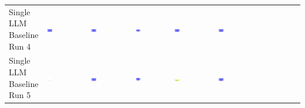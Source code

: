 \begin{table}
\begin{tabular}{@{}mmmmmm@{}}
    \makecell{Single LLM \\ Baseline \\ Run 4} & \includegraphics[width=0.13\textwidth]{./run_4/png/gpt-4o_results/BasicLayout.png} & \includegraphics[width=0.13\textwidth]{./run_4/png/o1-preview_results/BasicLayout.png} & \includegraphics[width=0.13\textwidth]{./run_4/png/claude-3-5-sonnet-20240620_results/BasicLayout.png} & \includegraphics[width=0.13\textwidth]{./run_4/png/watsonx_meta-llama_llama-3-1-70b-instruct_results/BasicLayout.png} & \includegraphics[width=0.13\textwidth]{./run_4/png/watsonx_meta-llama_llama-3-405b-instruct_results/BasicLayout.png} \\
    \makecell{Single LLM \\ Baseline \\ Run 5} & \includegraphics[width=0.13\textwidth]{./run_5/png/gpt-4o_results/BasicLayout.png} & \includegraphics[width=0.13\textwidth]{./run_5/png/o1-preview_results/BasicLayout.png} & \includegraphics[width=0.13\textwidth]{./run_5/png/claude-3-5-sonnet-20240620_results/BasicLayout.png} & \includegraphics[width=0.13\textwidth]{./run_5/png/watsonx_meta-llama_llama-3-1-70b-instruct_results/BasicLayout.png} & \includegraphics[width=0.13\textwidth]{./run_5/png/watsonx_meta-llama_llama-3-405b-instruct_results/BasicLayout.png} \\

\end{tabular}
\end{table}
